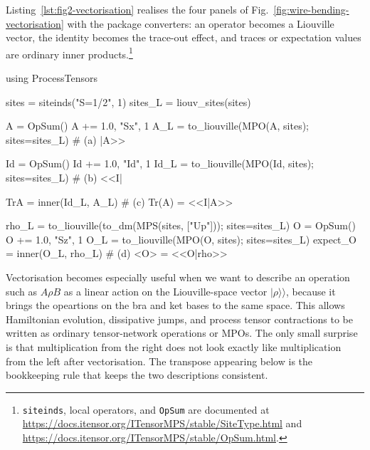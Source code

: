 Listing~\ref{lst:fig2-vectorisation} realises the four panels of Fig.~\ref{fig:wire-bending-vectorisation} with the package converters: an operator becomes a Liouville vector, the identity becomes the trace-out effect, and traces or expectation values are ordinary inner products.\footnote{\texttt{siteinds}, local operators, and \texttt{OpSum} are documented at \url{https://docs.itensor.org/ITensorMPS/stable/SiteType.html} and \url{https://docs.itensor.org/ITensorMPS/stable/OpSum.html}.}

%
\begin{juliacode}[
  caption={Vectorisation, the identity, and Liouville closures matching Fig.~\ref{fig:wire-bending-vectorisation}(a)--(d).},
  label={lst:fig2-vectorisation},
]
using ProcessTensors

sites = siteinds("S=1/2", 1)
sites_L = liouv_sites(sites)

A = OpSum()
A += 1.0, "Sx", 1
A_L = to_liouville(MPO(A, sites); sites=sites_L) # (a) |A>>

Id = OpSum()
Id += 1.0, "Id", 1
Id_L = to_liouville(MPO(Id, sites); sites=sites_L) # (b) <<I|

TrA = inner(Id_L, A_L) # (c) Tr(A) = <<I|A>>

rho_L = to_liouville(to_dm(MPS(sites, ["Up"])); sites=sites_L)
O = OpSum()
O += 1.0, "Sz", 1
O_L = to_liouville(MPO(O, sites); sites=sites_L)
expect_O = inner(O_L, rho_L) # (d) <O> = <<O|rho>>
\end{juliacode}
%

\label{subsec:left-right-actions}

Vectorisation becomes especially useful when we want to describe an operation such as \(A\rho B\) as a linear action on the Liouville-space vector \(\lvert\rho\rangle\!\rangle\), because it brings the opeartions on the bra and ket bases to the same space.
This allows Hamiltonian evolution, dissipative jumps, and process tensor contractions to be written as ordinary tensor-network operations or MPOs.
The only small surprise is that multiplication from the right does not look exactly like multiplication from the left after vectorisation.
The transpose appearing below is the bookkeeping rule that keeps the two descriptions consistent.

